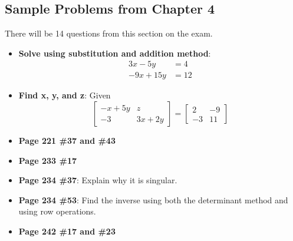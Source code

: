 \documentclass[12pt]{article}
\begin{document}
\subsection*{Sample Problems from Chapter 4}
There will be 14 questions from this section on the exam.
\begin{itemize}
\item \textbf{Solve using substitution and addition method}: 
\begin{align*} 
3x - 5y &= 4 \\ 
-9x + 15y &= 12
\end{align*}

\item \textbf{Find x, y, and z}:
Given
$$\begin{bmatrix}
-x + 5y & z \\
-3 & 3x + 2y
\end{bmatrix}
= 
\begin{bmatrix}
2 & -9 \\
-3 & 11
\end{bmatrix}
$$

\item \textbf{Page 221 \#37 and \#43}
\item \textbf{Page 233 \#17}
\item \textbf{Page 234 \#37}: Explain why it is singular.
\item \textbf{Page 234 \#53}: Find the inverse using both the determinant method and using row operations.
\item \textbf{Page 242 \#17 and \#23}

\end{itemize}
\end{document}
